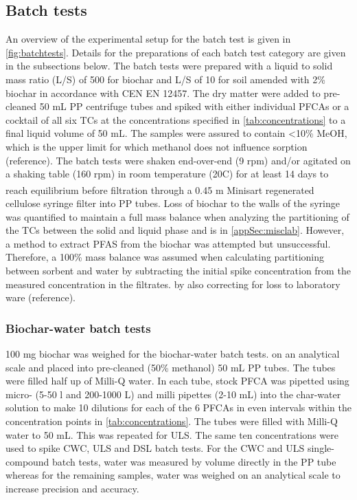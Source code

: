 \subsection{Batch tests}
An overview of the experimental setup for the batch test is given in \cref{fig:batchtests}. Details for the preparations of each batch test category are given in the subsections below. The batch tests were prepared with a liquid to solid mass ratio (L/S) of 500 for biochar and L/S of 10 for soil amended with 2\% biochar in accordance with CEN EN 12457. The dry matter were added to pre-cleaned 50 mL PP centrifuge tubes and spiked with either individual PFCAs or a cocktail of all six TCs at the concentrations specified in \cref{tab:concentrations} to a final liquid volume of 50 mL. The samples were assured to contain \textless 10\% MeOH, which is the upper limit for which methanol does not influence sorption (reference). The batch tests were shaken end-over-end (9 rpm) and/or agitated on a shaking table (160 rpm) in room temperature (20\textdegree C) for at least 14 days to reach equilibrium \citep{higgins2006} before filtration through a 0.45 \textmu m Minisart\textsuperscript{\textregistered} regenerated cellulose syringe filter into PP tubes. Loss of biochar to the walls of the syringe was quantified to maintain a full mass balance when analyzing the partitioning of the TCs between the solid and liquid phase and is in \cref{appSec:misclab}. However, a method to extract PFAS from the biochar was attempted but unsuccessful. Therefore, a 100\% mass balance was assumed when calculating partitioning between sorbent and water by subtracting the initial spike concentration from the measured concentration in the filtrates. by also correcting for loss to laboratory ware (reference). 

\subsubsection{Biochar-water batch tests}
100  mg biochar was weighed for the biochar-water batch tests. on an analytical scale and placed into pre-cleaned (50\% methanol) 50 mL PP tubes. The tubes were filled half up of Milli-Q water. In each tube, stock PFCA was pipetted using micro- (5-50 {\textmu}l and 200-1000 {\textmu}L) and milli pipettes (2-10 mL) into the char-water solution to make 10 dilutions for each of the 6 PFCAs in even intervals within the concentration points in \cref{tab:concentrations}. The tubes were filled with Milli-Q water to 50 mL. This was repeated for ULS. The same ten concentrations were used to spike CWC, ULS and DSL batch tests. For the CWC and ULS single-compound batch tests, water was measured by volume directly in the PP tube whereas for the remaining samples, water was weighed on an analytical scale to increase precision and accuracy. 

